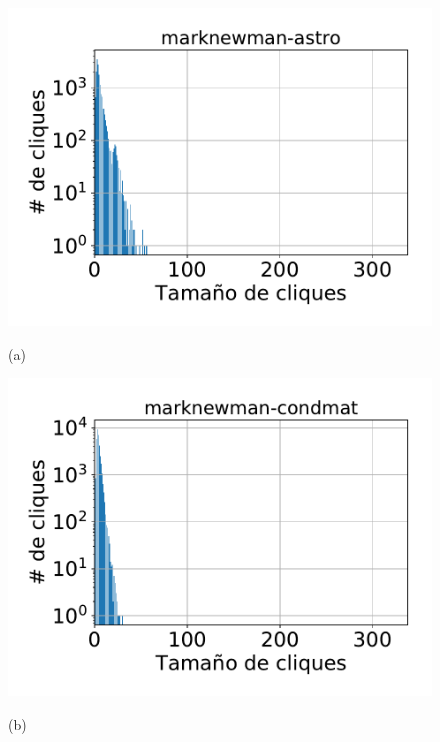\begin{figure}
	{\normalsize
   		\centering
    	\begin{minipage}{1\textwidth}
    		\centering
    		\begin{minipage}{0.45\textwidth}
    			\centering
    			\includegraphics[width=1\linewidth]{img/cliqueDist2/marknewman-astro.pdf}
    			
    			(a)
    		\end{minipage}
    		\begin{minipage}{0.45\textwidth}
    			\centering
    			\includegraphics[width=1\linewidth]{img/cliqueDist2/marknewman-condmat.pdf}
    			
    			(b)
    		\end{minipage}  		
    	\end{minipage}
    	
}
\end{figure}
